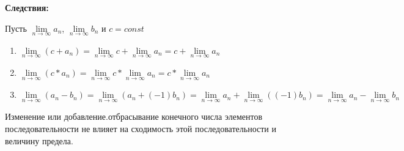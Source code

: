 \documentclass{article}
\begin{document}
\textbf{Следствия:}

Пусть \exists $\lim\limits_{n\to\infty}{a_n}$,  \exists $\lim\limits_{n\to\infty}{b_n}$ и $c=const$

\begin{enumerate}

\item $\lim\limits_{n\to\infty}{(c+a_n)}=\lim\limits_{n\to\infty}{c}+\lim\limits_{n\to\infty}{a_n}=c+\lim\limits_{n\to\infty}{a_n}$

\item $\lim\limits_{n\to\infty}{(c*a_n)}=\lim\limits_{n\to\infty}{c}*\lim\limits_{n\to\infty}{a_n}=c*\lim\limits_{n\to\infty}{a_n}$

\item $\lim\limits_{n\to\infty}{(a_n-b_n)}=\lim\limits_{n\to\infty}{(a_n+(-1)b_n)}=\lim\limits_{n\to\infty}{a_n}+\lim\limits_{n\to\infty}{((-1)b_n)}=\lim\limits_{n\to\infty}{a_n}-\lim\limits_{n\to\infty}{b_n}$

\end{enumerate}

Изменение или добавление.отбрасывание конечного числа элементов последовательности не влияет на сходимость этой последовательности и величину предела.
\end{document}
